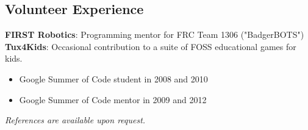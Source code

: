 \documentclass[line,margin]{res}
\begin{document}
\begin{resume}
\section{\sc Volunteer Experience}          
    \textbf{FIRST Robotics}: Programming mentor for FRC Team 1306 ("BadgerBOTS") \\
    \textbf{Tux4Kids}: Occasional contribution to a suite of FOSS educational games for kids.
    \begin{itemize}
        \item Google Summer of Code student in 2008 and 2010 
        \item Google Summer of Code mentor in 2009 and 2012
    \end{itemize}

\end{resume}

\vfill
\hfill \textit{\small References are available upon request.}
\end{document}
